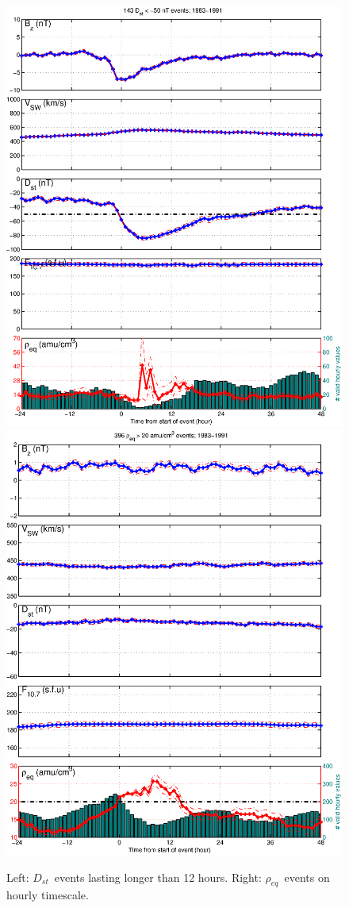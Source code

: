 \documentclass[xcolor={dvipsnames,table}]{beamer}
\newcommand{\req}{\ensuremath{\rho_{eq}}} %
\newcommand{\dst}{\ensuremath{D_{st}}} %
\begin{document}
\begin{frame}
\begin{figure}[htp!]
	\centering
	\includegraphics[width=0.4\linewidth]{Figures/StormAvs/stormavs-dd12-GOES6}
	\includegraphics[width=0.4\linewidth]{Figures/StormAvs/stormavs-mass-gt20-GOES6}
	\caption{Left: \dst\ events lasting longer than 12 hours. Right: \req\ events on hourly timescale.}
	\label{fig:EpochDst12Hour}
\end{figure}
\end{frame}
\end{document}
